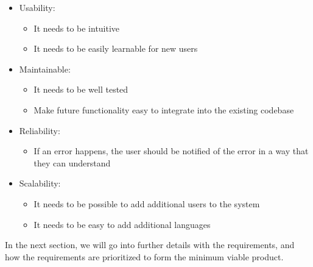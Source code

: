 \begin{itemize}
    \item Usability:
    \begin{itemize}
        \item It needs to be intuitive
        \item It needs to be easily learnable for new users
    \end{itemize}
    \item Maintainable:
    \begin{itemize}
        \item It needs to be well tested
        \item Make future functionality easy to integrate into the existing codebase
    \end{itemize}
    \item Reliability:
    \begin{itemize}
        \item If an error happens, the user should be notified of the error in a way that they can understand
    \end{itemize}
    \item Scalability:
    \begin{itemize}
        \item It needs to be possible to add additional users to the system
        \item It needs to be easy to add additional languages
    \end{itemize}
\end{itemize}
\noindent
In the next section, we will go into further details with the requirements, and how the requirements are prioritized to form the minimum viable product.
